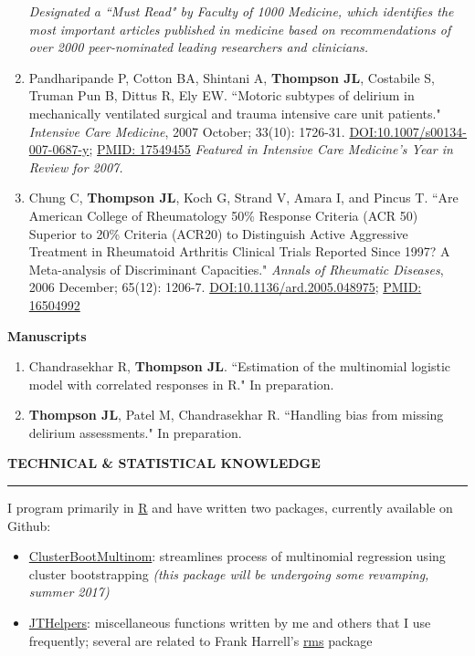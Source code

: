 \documentclass[5pt]{article}
\begin{document}
\begin{enumerate}
    \emph{Designated a ``Must Read" by Faculty of 1000 Medicine, which identifies the most important articles published in medicine based on recommendations of over 2000 peer-nominated leading researchers and clinicians.}
\item Pandharipande P, Cotton BA, Shintani A, \textbf{Thompson JL}, Costabile S, Truman Pun B, Dittus R, Ely EW. ``Motoric subtypes of delirium in mechanically ventilated surgical and trauma intensive care unit patients." \emph{Intensive Care Medicine}, 2007 October; 33(10): 1726-31. \href{https://doi.org/10.1007/s00134-007-0687-y}{DOI:10.1007/s00134-007-0687-y}; \href{https://www.ncbi.nlm.nih.gov/pubmed/17549455}{PMID: 17549455} \emph{Featured in Intensive Care Medicine's Year in Review for 2007.}
\item Chung C, \textbf{Thompson JL}, Koch G, Strand V, Amara I, and Pincus T. ``Are American College of Rheumatology 50\% Response Criteria (ACR 50) Superior to 20\% Criteria (ACR20) to Distinguish Active Aggressive Treatment in Rheumatoid Arthritis Clinical Trials Reported Since 1997? A Meta-analysis of Discriminant Capacities." \emph{Annals of Rheumatic Diseases}, 2006 December; 65(12): 1206-7. \href{https://doi.org/10.1136/ard.2005.048975}{DOI:10.1136/ard.2005.048975}; \href{https://www.ncbi.nlm.nih.gov/pubmed/16504992}{PMID: 16504992}
\end{enumerate}

\noindent \textbf{Manuscripts}
\begin{enumerate}
\item Chandrasekhar R, \textbf{Thompson JL}. ``Estimation of the multinomial logistic model with correlated responses in R." In preparation.
\item \textbf{Thompson JL}, Patel M, Chandrasekhar R. ``Handling bias from missing delirium assessments." In preparation.
\end{enumerate}

\noindent \linebreak \textbf{TECHNICAL \& STATISTICAL KNOWLEDGE}\\
\rule[5pt]{\linewidth}{1.0pt}
\noindent I program primarily in \href{http://www.r-project.org}{R} and have written two packages, currently available on Github:
\begin{itemize}
\item \href{https://github.com/jenniferthompson/ClusterBootMultinom}{ClusterBootMultinom}: streamlines process of multinomial regression using cluster bootstrapping \emph{(this package will be undergoing some revamping, summer 2017)}
\item \href{https://github.com/jenniferthompson/JTHelpers}{JTHelpers}: miscellaneous functions written by me and others that I use frequently; several are related to Frank Harrell's \href{https://cran.r-project.org/web/packages/rms/index.html}{rms} package
\end{itemize}
\end{document}
